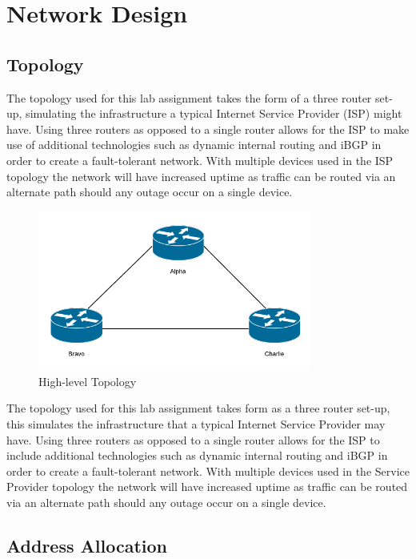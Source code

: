 \chapter{Network Design}

\section{Topology}

The topology used for this lab assignment takes the form of a three router set-
up, simulating the infrastructure a typical Internet Service Provider (ISP)
might have. Using three routers as opposed to a single router allows for the
ISP to make use of additional technologies such as dynamic internal routing and
iBGP in order to create a fault-tolerant network. With multiple devices used in
the ISP topology the network will have increased uptime as traffic can be
routed via an alternate path should any outage occur on a single device.

\begin{figure}[!ht]
    \caption{High-level Topology}
    \centering
    \includegraphics[width=0.8\textwidth]{images/networkTopology.png}
\end{figure}

The topology used for this lab assignment takes form as a three router set-up,
this simulates the infrastructure that a typical Internet Service Provider may
have. Using three routers as opposed to a single router allows for the ISP to
include additional technologies such as dynamic internal routing and iBGP in
order to create a fault-tolerant network. With multiple devices used in the
Service Provider topology the network will have increased uptime as traffic can
be routed via an alternate path should any outage occur on a single device.

\section{Address Allocation}
